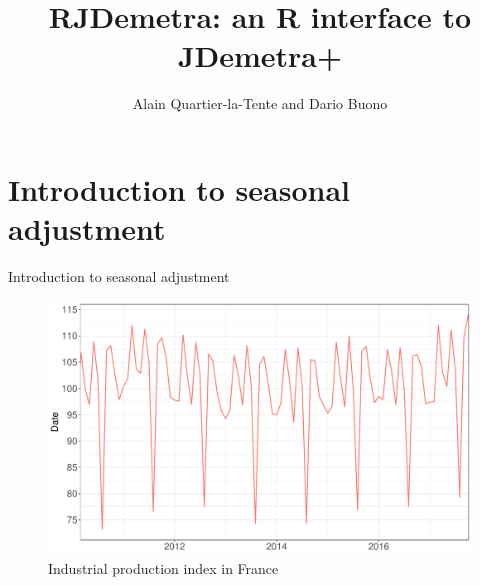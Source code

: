 \documentclass[10pt,xcolor=table,color={dvipsnames,usenames},ignorenonframetext,usepdftitle=false,french]{beamer}
\title{RJDemetra: an R interface to JDemetra+}
\author{Alain Quartier-la-Tente and Dario Buono}
\date{}
\begin{document}
\begin{frame}
\titlepage
\end{frame}

\hypertarget{introduction-to-seasonal-adjustment}{%
\section{Introduction to seasonal
adjustment}\label{introduction-to-seasonal-adjustment}}

\begin{frame}{Introduction to seasonal adjustment}
\protect\hypertarget{introduction-to-seasonal-adjustment-1}{}

\begin{figure}
\centering
\includegraphics{img/markdown-unnamed-chunk-1-1.pdf}
\caption{Industrial production index in France}
\end{figure}

\end{frame}
\end{document}
